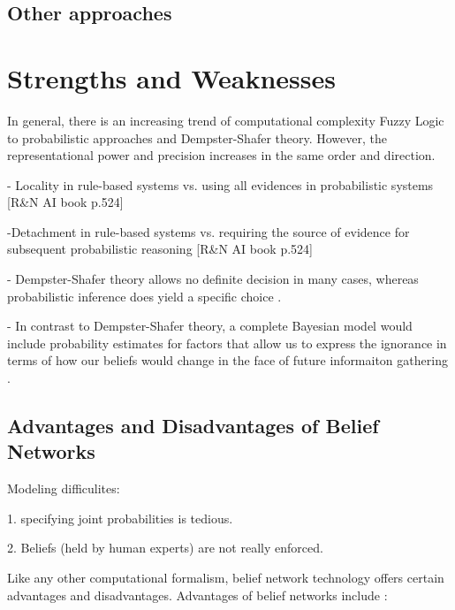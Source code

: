 \documentclass[11pt]{article}
\begin{document}
\subsection{Other approaches}

\section{Strengths and Weaknesses}

In general, there is an increasing trend of computational complexity Fuzzy Logic
to probabilistic approaches and Dempster-Shafer theory. However, the
representational power and precision increases in the same order and direction.

- Locality in rule-based systems vs. using all evidences in probabilistic
systems [R\&N AI book p.524]

-Detachment in rule-based systems vs. requiring the source of evidence for
subsequent probabilistic reasoning [R\&N AI book p.524]

- Dempster-Shafer theory allows no definite decision in many cases, whereas
probabilistic inference does yield a specific choice \cite{russell:ai-modern}.

- In contrast to Dempster-Shafer theory, a complete Bayesian model would include
probability estimates for factors that allow us to express the ignorance in
terms of how our beliefs would change in the face of future informaiton
gathering \cite{russell:ai-modern}.

\subsection{Advantages and Disadvantages of Belief Networks}

Modeling difficulites:

1. specifying joint probabilities is tedious.

2. Beliefs (held by human experts) are not really enforced.

Like any other computational formalism, belief network technology offers certain
advantages and disadvantages. Advantages of belief networks include
\cite{das:decision-making-agents}:
\end{document}
